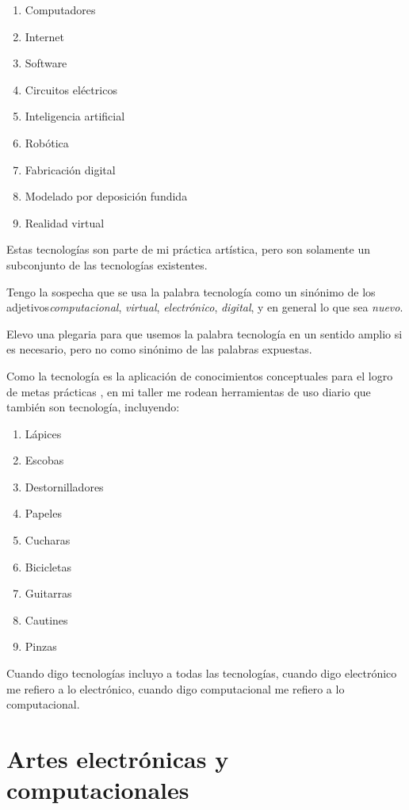 \documentclass{article}
\begin{document}
\begin{enumerate}
    \item Computadores
    \item Internet
    \item Software
    \item Circuitos eléctricos
    \item Inteligencia artificial
    \item Robótica
    \item Fabricación digital
    \item Modelado por deposición fundida
    \item Realidad virtual
\end{enumerate}

Estas tecnologías son parte de mi práctica artística, pero son solamente un subconjunto de las tecnologías existentes.

Tengo la sospecha que se usa la palabra tecnología como un sinónimo de los adjetivos\textit{computacional}, \textit{virtual}, \textit{electrónico}, \textit{digital}, y en general lo que sea \textit{nuevo}.

Elevo una plegaria para que usemos la palabra tecnología en un sentido amplio si es necesario, pero no como sinónimo de las palabras expuestas.

Como la tecnología es la aplicación de conocimientos conceptuales para el logro de metas prácticas \cite{technology}, en mi taller me rodean herramientas de uso diario que también son tecnología, incluyendo:

\begin{enumerate}
    \item Lápices
    \item Escobas
    \item Destornilladores
    \item Papeles
    \item Cucharas
    \item Bicicletas
    \item Guitarras
    \item Cautines
    \item Pinzas
\end{enumerate}

Cuando digo tecnologías incluyo a todas las tecnologías, cuando digo electrónico me refiero a lo electrónico, cuando digo computacional me refiero a lo computacional.

\clearpage

\section{Artes electrónicas y computacionales}
\end{document}
